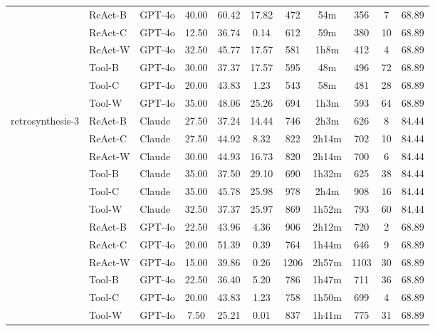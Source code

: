 \begin{longtable}{lllcccccccc}
 & ReAct-B & GPT-4o & 40.00 & 60.42 & 17.82 & 472 & 54m & 356 & 7 & 68.89 \\
 & ReAct-C & GPT-4o & 12.50 & 36.74 & 0.14 & 612 & 59m & 380 & 10 & 68.89 \\
 & ReAct-W & GPT-4o & 32.50 & 45.77 & 17.57 & 581 & 1h8m & 412 & 4 & 68.89 \\
 & Tool-B & GPT-4o & 30.00 & 37.37 & 17.57 & 595 & 48m & 496 & 72 & 68.89 \\
 & Tool-C & GPT-4o & 20.00 & 43.83 & 1.23 & 543 & 58m & 481 & 28 & 68.89 \\
 & Tool-W & GPT-4o & 35.00 & 48.06 & 25.26 & 694 & 1h3m & 593 & 64 & 68.89 \\
retrosynthesis-3 & ReAct-B & Claude & 27.50 & 37.24 & 14.44 & 746 & 2h3m & 626 & 8 & 84.44 \\
 & ReAct-C & Claude & 27.50 & 44.92 & 8.32 & 822 & 2h14m & 702 & 10 & 84.44 \\
 & ReAct-W & Claude & 30.00 & 44.93 & 16.73 & 820 & 2h14m & 700 & 6 & 84.44 \\
 & Tool-B & Claude & 35.00 & 37.50 & 29.10 & 690 & 1h32m & 625 & 38 & 84.44 \\
 & Tool-C & Claude & 35.00 & 45.78 & 25.98 & 978 & 2h4m & 908 & 16 & 84.44 \\
 & Tool-W & Claude & 32.50 & 37.37 & 25.97 & 869 & 1h52m & 793 & 60 & 84.44 \\
 & ReAct-B & GPT-4o & 22.50 & 43.96 & 4.36 & 906 & 2h12m & 720 & 2 & 68.89 \\
 & ReAct-C & GPT-4o & 20.00 & 51.39 & 0.39 & 764 & 1h44m & 646 & 9 & 68.89 \\
 & ReAct-W & GPT-4o & 15.00 & 39.86 & 0.26 & 1206 & 2h57m & 1103 & 30 & 68.89 \\
 & Tool-B & GPT-4o & 22.50 & 36.40 & 5.20 & 786 & 1h47m & 711 & 36 & 68.89 \\
 & Tool-C & GPT-4o & 20.00 & 43.83 & 1.23 & 758 & 1h50m & 699 & 4 & 68.89 \\
 & Tool-W & GPT-4o & 7.50 & 25.21 & 0.01 & 837 & 1h41m & 775 & 31 & 68.89 \\
\end{longtable}
